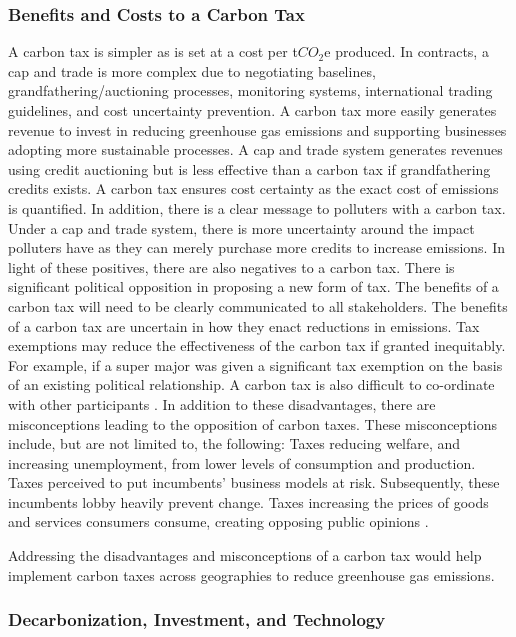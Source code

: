 \documentclass[12pt]{article}
\begin{document}
\subsubsection{Benefits and Costs to a Carbon Tax}
A carbon tax is simpler as is set at a cost per t$CO_2$e produced. 
In contracts, a cap and trade is more complex due to negotiating baselines, grandfathering/auctioning processes, monitoring systems, international trading guidelines, and cost uncertainty prevention.
A carbon tax more easily generates revenue to invest in reducing greenhouse gas emissions and supporting businesses adopting more sustainable processes. 
A cap and trade system generates revenues using credit auctioning but is less effective than a carbon tax if grandfathering credits exists.
A carbon tax ensures cost certainty as the exact cost of emissions is quantified. 
In addition, there is a clear message to polluters with a carbon tax. 
Under a cap and trade system, there is more uncertainty around the impact polluters have as they can merely purchase more credits to increase emissions.
In light of these positives, there are also negatives to a carbon tax. 
There is significant political opposition in proposing a new form of tax. 
The benefits of a carbon tax will need to be clearly communicated to all stakeholders. 
The benefits of a carbon tax are uncertain in how they enact reductions in emissions. 
Tax exemptions may reduce the effectiveness of the carbon tax if granted inequitably. 
For example, if a super major was given a significant tax exemption on the basis of an existing political relationship.
A carbon tax is also difficult to co-ordinate with other participants \cite{J:6}. 
In addition to these disadvantages, there are misconceptions leading to the opposition of carbon taxes. 
These misconceptions include, but are not limited to, the following: Taxes reducing welfare, and increasing unemployment, from lower levels of consumption and production. 
Taxes perceived to put incumbents' business models at risk. Subsequently, these incumbents lobby heavily prevent change.
Taxes increasing the prices of goods and services consumers consume, creating opposing public opinions \cite{A:3}.

Addressing the disadvantages and misconceptions of a carbon tax would help implement carbon taxes across geographies to reduce greenhouse gas emissions.

\subsubsection{Decarbonization, Investment, and Technology}
\end{document}
